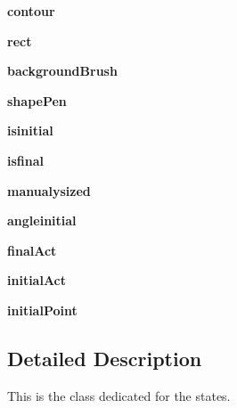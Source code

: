 \begin{DoxyCompactItemize}
\mbox{\label{classState_1_1State_a375fdb70a1997d52a679b093b51d4f97}} 
{\bfseries contour}
\item 
\mbox{\label{classState_1_1State_aa232caff1f513465226e7f7a9b0b8aac}} 
{\bfseries rect}
\item 
\mbox{\label{classState_1_1State_af162a4ad84fb3c03b10fc1bd1e8dbd23}} 
{\bfseries background\+Brush}
\item 
\mbox{\label{classState_1_1State_aac582b5c8940d28be0fbe58511a13331}} 
{\bfseries shape\+Pen}
\item 
\mbox{\label{classState_1_1State_a5142e18c89e1b29a846cd967dd7ae5a7}} 
{\bfseries isinitial}
\item 
\mbox{\label{classState_1_1State_a79734537721919dc94ba17701c564d11}} 
{\bfseries isfinal}
\item 
\mbox{\label{classState_1_1State_a8d7214ddcac0728f689dbca4c354e27a}} 
{\bfseries manualysized}
\item 
\mbox{\label{classState_1_1State_a658cafae2cd7e412bfbf137c6ff3fe3a}} 
{\bfseries angleinitial}
\item 
\mbox{\label{classState_1_1State_af11e1dddf7c1dc870448c6c5fa0a31e2}} 
{\bfseries final\+Act}
\item 
\mbox{\label{classState_1_1State_aca2e06520b4d42051049fbfcbc6c55fe}} 
{\bfseries initial\+Act}
\item 
\mbox{\label{classState_1_1State_aedb1334aed3030b02439b92fed7abc40}} 
{\bfseries initial\+Point}
\end{DoxyCompactItemize}


\subsection{Detailed Description}
This is the class dedicated for the states. 

